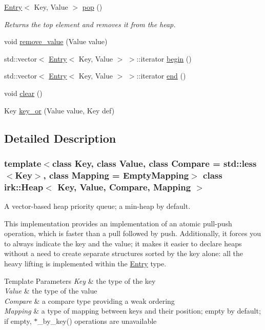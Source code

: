 \begin{DoxyCompactItemize}
\mbox{\hyperlink{structirk_1_1Entry}{Entry}}$<$ Key, Value $>$ \mbox{\hyperlink{classirk_1_1Heap_ad4ca0d2503acd1748bb22e19a1be663e}{pop}} ()
\begin{DoxyCompactList}\small\item\em Returns the top element and removes it from the heap. \end{DoxyCompactList}\item 
void \mbox{\hyperlink{classirk_1_1Heap_a224c213a1e7bf8a073b39ac52659285c}{remove\+\_\+value}} (Value value)
\item 
std\+::vector$<$ \mbox{\hyperlink{structirk_1_1Entry}{Entry}}$<$ Key, Value $>$ $>$\+::iterator \mbox{\hyperlink{classirk_1_1Heap_a10a78919e46bc987f874bb8558e23e25}{begin}} ()
\item 
std\+::vector$<$ \mbox{\hyperlink{structirk_1_1Entry}{Entry}}$<$ Key, Value $>$ $>$\+::iterator \mbox{\hyperlink{classirk_1_1Heap_af663889a1e5ba217970a850b5a9f21ff}{end}} ()
\item 
void \mbox{\hyperlink{classirk_1_1Heap_a20592a73ac29a73743196a7458600f47}{clear}} ()
\item 
Key \mbox{\hyperlink{classirk_1_1Heap_ae816d710ad7e5f482f492956156cf586}{key\+\_\+or}} (Value value, Key def)
\end{DoxyCompactItemize}


\subsection{Detailed Description}
\subsubsection*{template$<$class Key, class Value, class Compare = std\+::less$<$\+Key$>$, class Mapping = Empty\+Mapping$>$\newline
class irk\+::\+Heap$<$ Key, Value, Compare, Mapping $>$}

A vector-\/based heap priority queue; a min-\/heap by default.

This implementation provides an implementation of an atomic pull-\/push operation, which is faster than a pull followed by push. Additionally, it forces you to always indicate the key and the value; it makes it easier to declare heaps without a need to create separate structures sorted by the key alone\+: all the heavy lifting is implemented within the \mbox{\hyperlink{structirk_1_1Entry}{Entry}} type.


\begin{DoxyTemplParams}{Template Parameters}
{\em Key} & the type of the key \\
\hline
{\em Value} & the type of the value \\
\hline
{\em Compare} & a compare type providing a weak ordering \\
\hline
{\em Mapping} & a type of mapping between keys and their position; empty by default; if empty, $\ast$\+\_\+by\+\_\+key() operations are unavailable \\
\hline
\end{DoxyTemplParams}


